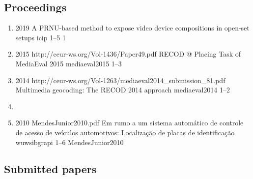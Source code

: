 \subsection*{Proceedings}

\begin{enumerate}[resume]
\item{}
  {
  }
  {2019}
  {}
  {A PRNU-based method to expose video device compositions in open-set setups}
  {icip}
  {1--5}
  {1}
  {}
\item{}
  {
  }
  {2015}
  {http://ceur-ws.org/Vol-1436/Paper49.pdf}
  {RECOD @ Placing Task of MediaEval 2015}
  {mediaeval2015}
  {1--3}
  {}
  {}
\item{}
  {
  }
  {2014}
  {http://ceur-ws.org/Vol-1263/mediaeval2014_submission_81.pdf}
  {Multimedia geocoding: The RECOD 2014 approach}
  {mediaeval2014}
  {1--2}
  {}
  {}
\item{}
\item{}
  {
  }
  {2010}
  {MendesJunior2010.pdf}
  {Em rumo a um sistema automático de controle de acesso de veículos automotivos: Localização de placas de identificação}
  {wuwsibgrapi}
  {1--6}
  {}
  {MendesJunior2010}
\end{enumerate}

\subsection*{Submitted papers}

